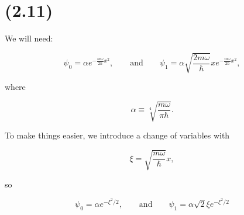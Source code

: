 \section{(2.11)}


We will need:

\begin{equation}
    \psi_0 = \alpha e^{-\frac{m\omega}{2\hbar}x^2}, \qquad \mathrm{and} \qquad \psi_1 = \alpha \sqrt{\frac{2m\omega}{\hbar}}x e^{-\frac{m\omega}{2\hbar}x^2},
\end{equation}

where

\begin{equation}
    \alpha \equiv \sqrt[4]{\frac{m\omega}{\pi\hbar}}.
\end{equation}

To make things easier, we introduce a change of variables with

\begin{equation*}
    \xi = \sqrt{\frac{m\omega}{\hbar}}x, 
\end{equation*}

so

\begin{equation*}
    \psi_0 = \alpha e^{-\xi^2/2}, \qquad \mathrm{and} \qquad \psi_1 = \alpha \sqrt{2}\xi e^{-\xi^2/2}
\end{equation*}


